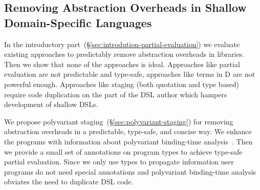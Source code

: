 %
%



\subsection{Removing Abstraction Overheads in Shallow Domain-Specific Languages}
\label{sec:removing-abstraction-overheads}

 In the introductory part~(\S \ref{sec:introdution-partial-evaluation}) we evaluate existing approaches
  to predictably remove abstraction overheads in libraries. Then we show that none of
  the approaches is ideal. Approaches like partial evaluation are not predictable and type-safe,
  approaches like  terms in D are not powerful enough. Approaches like staging (both quotation and type based)
  require code duplication on the part of the DSL author which hampers development of shallow DSLs.

We propose polyvariant staging~(\S \ref{sec:polyvariant-staging}) for removing abstraction
 overheads in a predictable, type-safe, and concise way. We enhance the programs with
 information about polyvariant binding-time analysis~\cite{rytz1992polyvariant}. Then we provide
  a small set of annotations on program types to achieve type-safe partial evaluation.
  Since we only use types to propagate information user programs do not need special annotations
  and polyvariant binding-time analysis obviates the need to duplicate DSL code.




